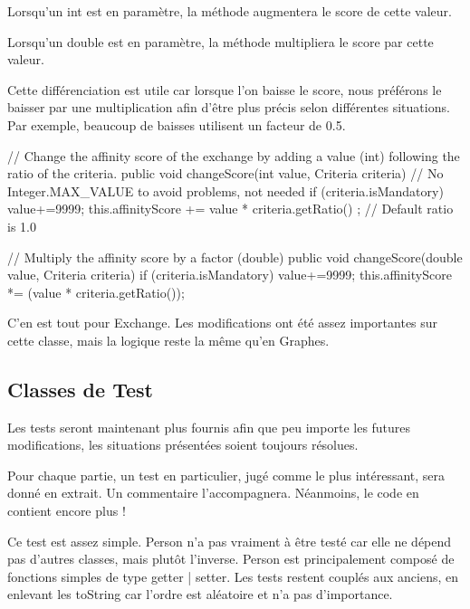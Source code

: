 \documentclass{mytex}
\begin{document}
Lorsqu'un int est en paramètre, la méthode augmentera le score de cette valeur.

Lorsqu'un double est en paramètre, la méthode multipliera le score par cette valeur.

Cette différenciation est utile car lorsque l'on baisse le score, nous préférons le baisser par une multiplication afin d'être plus précis selon différentes situations. Par exemple, beaucoup de baisses utilisent un facteur de 0.5.

\begin{codebox}
// Change the affinity score of the exchange by adding a value (int) following the ratio of the criteria.
public void changeScore(int value, Criteria criteria) {
	// No Integer.MAX_VALUE to avoid problems, not needed
	if (criteria.isMandatory) value+=9999;
	this.affinityScore += value * criteria.getRatio() ; // Default ratio is 1.0 
}

// Multiply the affinity score by a factor (double)
public void changeScore(double value, Criteria criteria) {
	if (criteria.isMandatory) value+=9999;
	this.affinityScore *= (value * criteria.getRatio());
}
\end{codebox}

C'en est tout pour Exchange. Les modifications ont été assez importantes sur cette classe, mais la logique reste la même qu'en Graphes.

\subsection{Classes de Test}

Les tests seront maintenant plus fournis afin que peu importe les futures modifications, les situations présentées soient toujours résolues.

Pour chaque partie, un test en particulier, jugé comme le plus intéressant, sera donné en extrait. Un commentaire l'accompagnera. Néanmoins, le code en contient encore plus !


Ce test est assez simple. Person n'a pas vraiment à être testé car elle ne dépend pas d'autres classes, mais plutôt l'inverse. Person est principalement composé de fonctions simples de type getter | setter. Les tests restent couplés aux anciens, en enlevant les toString car l'ordre est aléatoire et n'a pas d'importance.
\end{document}
